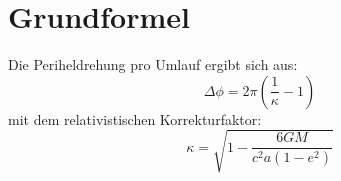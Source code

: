 \section{Grundformel}
Die Periheldrehung pro Umlauf ergibt sich aus:
\[
\Delta \phi = 2\pi \left( \frac{1}{\kappa} - 1 \right)
\]
mit dem relativistischen Korrekturfaktor:
\[
\kappa = \sqrt{1 - \frac{6GM}{c^2 a (1-e^2)}}
\]
